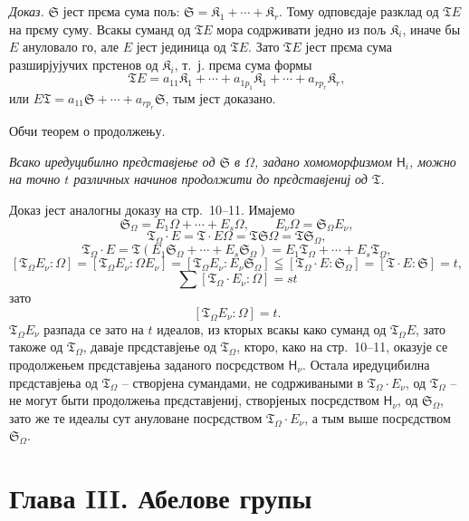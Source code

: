 \documentclass[11pt]{article}
\begin{document}
\emph{Доказ.} \(\mathfrak S\) јест прєма сума пољ: \(\mathfrak S=\mathfrak K_1+\cdots+\mathfrak K_r\). Тому одповєдаје разклад од \(\mathfrak T E\) на прєму суму. Всакы суманд од \(\mathfrak T E\) мора содрживати једно из пољ \(\mathfrak K_i\), иначе бы \(E\) ануловало го, але \(E\) јест јединица од \(\mathfrak T E\). Зато \(\mathfrak T E\) јест прєма сума разширјујучих прстенов од \(\mathfrak K_i\), т.~ј. прєма сума формы
\[
\mathfrak T E=a_{11}\mathfrak K_1+\cdots+a_{1p_1}\mathfrak K_1+\cdots+a_{rp_r}\mathfrak K_r,
\]
или \(E\mathfrak T=a_{11}\mathfrak S+\cdots+a_{rp_r}\mathfrak S\), тым јест доказано.

\begin{center}
Обчи теорем о продолжењу.
\end{center}

\emph{Всако иредуцибилно прєдставјење од \(\mathfrak S\) в \(\Omega\), задано хомоморфизмом \(\mathsf{H}_i\), можно на точно \(t\) различных начинов продолжити до прєдставјениј од \(\mathfrak T\).}

Доказ јест аналогны доказу на стр.~10--11. Имајемо
\[
\mathfrak S_\Omega=E_1\Omega+\cdots+E_s\Omega,\qquad
E_\nu\Omega=\mathfrak S_\Omega E_\nu,
\]
\[
\mathfrak T_\Omega\cdot E=\mathfrak T\cdot E\Omega
=\mathfrak T\mathfrak S\Omega=\mathfrak T\mathfrak S_\Omega,
\]
\[
\mathfrak T_\Omega\cdot E
=\mathfrak T(E_1\mathfrak S_\Omega+\cdots+E_s\mathfrak S_\Omega)
=E_1\mathfrak T_\Omega+\cdots+E_s\mathfrak T_\Omega,
\]
\[
[\mathfrak T_\Omega E_\nu:\Omega]
=[\mathfrak T_\Omega E_\nu:\Omega E_\nu]
=[\mathfrak T_\Omega E_\nu:E_\nu\mathfrak S_\Omega]
\leqq[\mathfrak T_\Omega\cdot E:\mathfrak S_\Omega]
=[\mathfrak T\cdot E:\mathfrak S]=t,
\]
\[
\sum[\mathfrak T_\Omega\cdot E_\nu:\Omega]=st
\]
зато
\[
[\mathfrak T_\Omega E_\nu:\Omega]=t.
\]
\(\mathfrak T_\Omega E_\nu\) разпада се зато на \(t\) идеалов, из кторых всакы како суманд од \(\mathfrak T_\Omega E\), зато такоже од \(\mathfrak T_\Omega\), даваје прєдставјење од \(\mathfrak T_\Omega\), кторо, како на стр.~10--11, оказује се продолжењем прєдставјења заданого посрєдством \(\mathsf{H}_\nu\). Остала иредуцибилна прєдставјења од \(\mathfrak T_\Omega\) -- створјена сумандами, не содрживаными в \(\mathfrak T_\Omega\cdot E_\nu\), од \(\mathfrak T_\Omega\) -- не могут быти продолжења прєдставјениј, створјеных посрєдством \(\mathsf{H}_\nu\), од \(\mathfrak S_\Omega\), зато же те идеалы сут ануловане посрєдством \(\mathfrak T_\Omega\cdot E_\nu\), а тым выше посрєдством \(\mathfrak S_\Omega\).

\section*{Глава III. Абелове групы}\label{kapitel-iii.-abelsche-gruppen}
\end{document}
